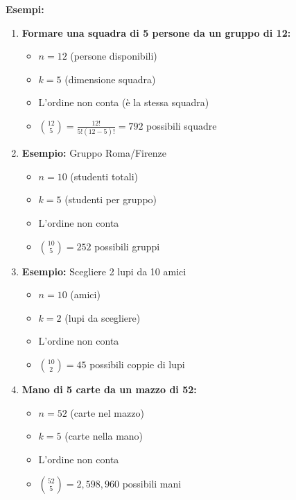 \textbf{Esempi:}
\begin{enumerate}
    \item \textbf{Formare una squadra di 5 persone da un gruppo di 12:}
    \begin{itemize}
        \item $n=12$ (persone disponibili)
        \item $k=5$ (dimensione squadra)
        \item L'ordine non conta (è la stessa squadra)
        \item $\binom{12}{5} = \frac{12!}{5!(12-5)!} = 792$ possibili squadre
    \end{itemize}

    \item \textbf{Esempio:} Gruppo Roma/Firenze
    \begin{itemize}
        \item $n=10$ (studenti totali)
        \item $k=5$ (studenti per gruppo)
        \item L'ordine non conta
        \item $\binom{10}{5} = 252$ possibili gruppi
    \end{itemize}

    \item \textbf{Esempio:} Scegliere 2 lupi da 10 amici
    \begin{itemize}
        \item $n=10$ (amici)
        \item $k=2$ (lupi da scegliere)
        \item L'ordine non conta
        \item $\binom{10}{2} = 45$ possibili coppie di lupi
    \end{itemize}

    \item \textbf{Mano di 5 carte da un mazzo di 52:}
    \begin{itemize}
        \item $n=52$ (carte nel mazzo)
        \item $k=5$ (carte nella mano)
        \item L'ordine non conta
        \item $\binom{52}{5} = 2{,}598{,}960$ possibili mani
    \end{itemize}
\end{enumerate}

